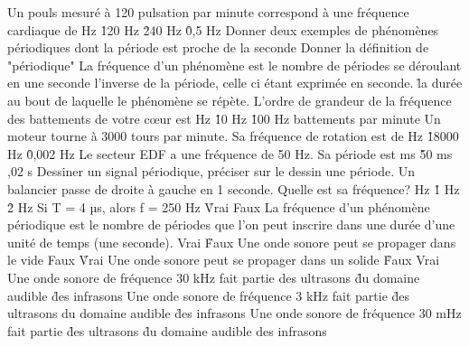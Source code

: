 \q
Un pouls mesuré à 120 pulsation par minute correspond à une fréquence cardiaque de 
 Hz
\r
120 Hz
\r
240 Hz
\r
0,5 Hz
\q
Donner deux exemples de phénomènes périodiques dont la période est proche de la seconde
\q
Donner la définition de "périodique"
\q
La fréquence d'un phénomène est
\rv
le nombre de périodes se déroulant en une seconde
\rv
l'inverse de la période, celle ci étant exprimée en seconde.
\r
la durée au bout de laquelle le phénomène se répète.
\q
L'ordre de grandeur de la fréquence des battements de votre c\oe ur est
 Hz
\r
10 Hz
\r
100 Hz
 battements par minute
\q
Un moteur tourne à 3000 tours par minute. Sa fréquence de rotation est de
 Hz
\r
18000 Hz
\r
0,002 Hz
\q
Le secteur EDF a une fréquence de 50 Hz. Sa période est
 ms
\r
50 ms
,02 s
\q
Dessiner un signal périodique, préciser sur le dessin une période.
\q
Un balancier passe de droite à gauche en 1 seconde.
Quelle est sa fréquence?
 Hz
\r
1 Hz
\r
2 Hz
\q
Si T = 4 $µ$s, alors  f = 250 Hz
\r
Vrai
\rv
Faux
\q
La fréquence d'un phénomène périodique est le nombre de périodes que l'on peut inscrire dans une durée d'une unité de temps (une seconde). 
\rv
Vrai
\r
Faux
\q 
Une onde sonore peut se propager dans le vide
\rv
Faux
\r
Vrai
\q
Une onde sonore peut se propager dans un solide
\r
Faux
\rv
Vrai
\q
Une onde sonore de fréquence 30 kHz fait partie
\rv
des ultrasons
\r
du domaine audible
\r
des infrasons
\q
Une onde sonore de fréquence 3 kHz fait partie
\r
des ultrasons
\rv
du domaine audible
\r
des infrasons
\q
Une onde sonore de fréquence 30 mHz fait partie
\r
des ultrasons
\r
du domaine audible
\rv
des infrasons


